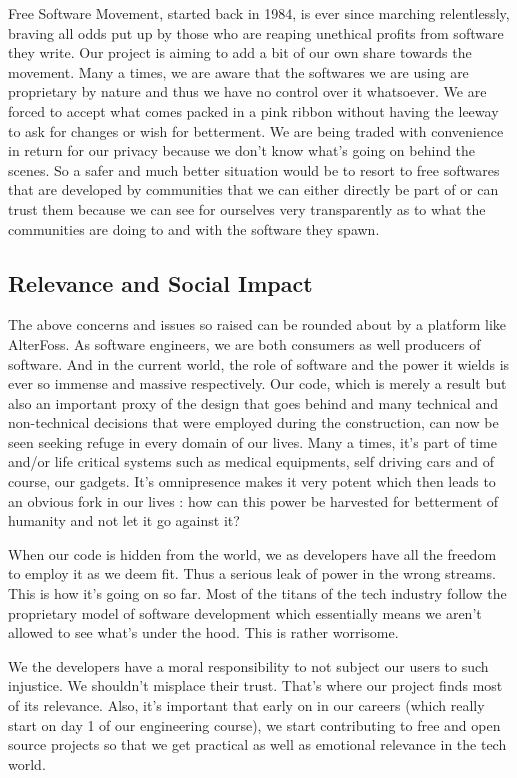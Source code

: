 Free Software Movement, started back in 1984, is ever since marching relentlessly, braving all odds put up by those who are reaping unethical profits from software they write. Our project is aiming to add a bit of our own share towards the movement. Many a times, we are aware that the softwares we are using are proprietary by nature and thus we have no control over it whatsoever. We are forced to accept what comes packed in a pink ribbon without having the leeway to ask for changes or wish for betterment. We are being traded with convenience in return for our privacy because we don’t know what’s going on behind the scenes. So a safer and much better situation would be to resort to free softwares that are developed by communities that we can either directly be part of or can trust them because we can see for ourselves very transparently as to what the communities are doing to and with the software they spawn.

\subsection{Relevance and Social Impact}
The above concerns and issues so raised can be rounded about by a platform like AlterFoss. As software engineers, we are both consumers as well producers of software. And in the current world, the role of software and the power it wields is ever so immense and massive respectively. Our code, which is merely a result but also an important proxy of the design that goes behind and many technical and non-technical decisions that were employed during the construction, can now be seen seeking refuge in every domain of our lives. Many a times, it’s part of time and/or life critical systems such as medical equipments, self driving cars and of course, our gadgets. It’s omnipresence makes it very potent which then leads to an obvious fork in our lives : how can this power be harvested for betterment of humanity and not let it go against it?

When our code is hidden from the world, we as developers have all the freedom to employ it as we deem fit. Thus a serious leak of power in the wrong streams. This is how it’s going on so far. Most of the titans of the tech industry follow the proprietary model of software development which essentially means we aren’t allowed to see what’s under the hood. This is rather worrisome. 

We the developers have a moral responsibility to not subject our users to such injustice. We shouldn’t misplace their trust. That’s where our project finds most of its relevance. Also, it’s important that early on in our careers (which really start on day 1 of our engineering course), we start contributing to free and open source projects so that we get practical as well as emotional relevance in the tech world. 

